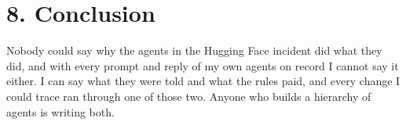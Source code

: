\section*{8. Conclusion}
Nobody could say why the agents in the Hugging Face incident did what they did, and with every prompt and reply of my own agents on record I cannot say it either. I can say what they were told and what the rules paid, and every change I could trace ran through one of those two. Anyone who builds a hierarchy of agents is writing both.
